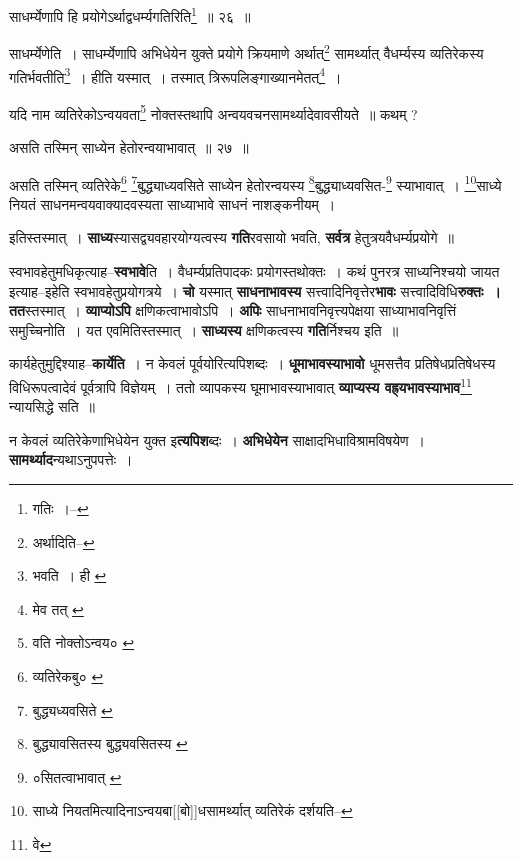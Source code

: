\documentclass[article,12pt,a4paper]{memoir}
\begin{document}
	  \pstart साधर्म्येणापि हि प्रयोगेऽर्थाद्वधर्म्यगतिरिति\footnote{गतिः ।--\cite{dp-msC}} ॥ २६ ॥
	\pend
       

	  \pstart साधर्म्येणेति । साधर्म्येणापि अभिधेयेन युक्ते प्रयोगे क्रियमाणे अर्थात्\footnote{अर्थादिति--\cite{dp-msC}} सामर्थ्यात् वैधर्म्यस्य व्यतिरेकस्य गतिर्भवतीति\footnote{भवति । ही \cite{dp-msB} \cite{dp-msC} \cite{dp-msD}} । हीति यस्मात् । तस्मात् त्रिरूपलिङ्गाख्यानमेतत्\footnote{मेव तत् \cite{dp-msC}} ।
	\pend
       

	  \pstart यदि नाम व्यतिरेकोऽन्वयवता\footnote{वति नोक्तोऽन्वय० \cite{dp-msA} \cite{dp-edP} \cite{dp-edE} \cite{dp-msC}} नोक्तस्तथापि अन्वयवचनसामर्थ्यादेवावसीयते ॥ कथम् ?
	\pend
       

	  \pstart असति तस्मिन् साध्येन हेतोरन्वयाभावात् ॥ २७ ॥
	\pend
       

	  \pstart असति तस्मिन् व्यतिरेके\footnote{व्यतिरेकबु० \cite{dp-msA}} \footnote{बुद्ध्यध्यवसिते \cite{dp-msA} \cite{dp-msB} \cite{dp-edP} \cite{dp-edH} \cite{dp-edE} \cite{dp-edN}}बुद्ध्याध्यवसिते साध्येन हेतोरन्वयस्य \footnote{बुद्ध्यावसितस्य \cite{dp-msA} \cite{dp-edP} \cite{dp-edH} \cite{dp-edE} \cite{dp-edN} बुद्ध्यवसितस्य \cite{dp-msB} \cite{dp-msD}}बुद्ध्याध्यवसित-\footnote{०सितत्वाभावात् \cite{dp-msC}} स्याभावात् । \footnote{साध्ये नियतमित्यादिनाऽन्वयबा[[बो]]धसामर्थ्यात् व्यतिरेकं दर्शयति--\cite{dp-msD-n}}साध्ये नियतं साधनमन्वयवाक्यादवस्यता साध्याभावे साधनं नाशङ्कनीयम् ।
	\pend
      

	  \pstart इतिस्तस्मात् । \textbf{साध्य}स्यासद्व्यवहारयोग्यत्वस्य \textbf{गति}रवसायो भवति, \textbf{सर्वत्र} हेतुत्रयवैधर्म्यप्रयोगे ॥
	\pend
      

	  \pstart स्वभावहेतुमधिकृत्याह--\textbf{स्वभावे}ति । वैधर्म्यप्रतिपादकः प्रयोगस्तथोक्तः । कथं पुनरत्र साध्यनिश्चयो जायत इत्याह--इहेति स्वभावहेतुप्रयोगत्रये । \textbf{चो} यस्मात् \textbf{साधनाभावस्य} सत्त्वादिनिवृत्तेर\textbf{भावः} सत्त्वादिविधि\textbf{रुक्तः । तत}स्तस्मात् । \textbf{व्याप्योऽपि} क्षणिकत्वाभावोऽपि । \textbf{अपिः} साधनाभावनिवृत्त्यपेक्षया साध्याभावनिवृत्तिं समुच्चिनोति । यत एवमितिस्तस्मात् । \textbf{साध्यस्य} क्षणिकत्वस्य \textbf{गति}र्निश्चय इति ॥
	\pend
      

	  \pstart कार्यहेतुमुद्दिश्याह--\textbf{कार्येति} । न केवलं पूर्वयोरित्यपिशब्दः । \textbf{धूमाभावस्याभावो} धूमसत्तैव प्रतिषेधप्रतिषेधस्य विधिरूपत्वादेवं पूर्वत्रापि विज्ञेयम् । ततो व्यापकस्य घूमाभावस्याभावात् \textbf{व्याप्यस्य वह्र्यभावस्याभाव}\footnote{वे} न्यायसिद्धे सति ॥
	\pend
      

	  \pstart न केवलं व्यतिरेकेणाभिधेयेन युक्त इ\textbf{त्यपिश}ब्दः । \textbf{अभिधेयेन} साक्षादभिधाविश्रामविषयेण । \textbf{सामर्थ्याद}न्यथाऽनुपपत्तेः ।
	\pend
      
\end{document}
